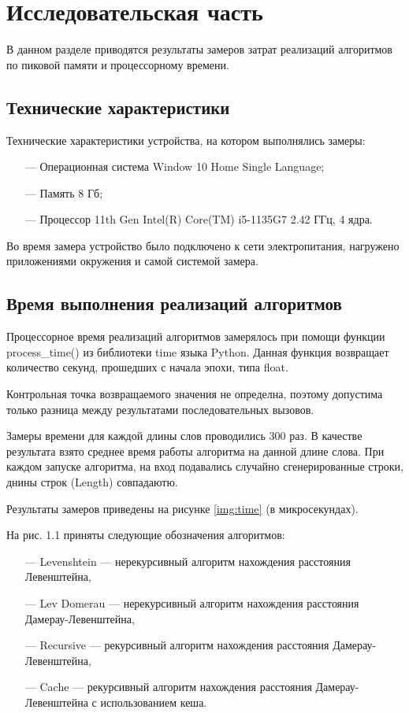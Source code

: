 \chapter{Исследовательская часть}

В данном разделе приводятся результаты замеров затрат реализаций алгоритмов по пиковой памяти и процессорному времени.

\section{Технические характеристики}

Технические характеристики устройства, на котором выполнялись замеры:

\begin{itemize}
	\item[---] Операционная система Window 10 Home Single Language;
	\item[---] Память 8 Гб;
	\item[---] Процессор 11th Gen Intel(R) Core(TM) i5-1135G7 2.42 ГГц, 4 ядра.
\end{itemize}

Во время замера устройство было подключено к сети электропитания, нагружено приложениями окружения и самой системой замера.

\section{Время выполнения реализаций алгоритмов}

Процессорное время реализаций алгоритмов замерялось при помощи функции process\_time() из библиотеки time языка Python. Данная функция возвращает количество секунд, прошедших с начала эпохи, типа float.

Контрольная точка возвращаемого значения не определна, поэтому допустима только разница между результатами последовательных вызовов.

Замеры времени для каждой длины слов проводились 300 раз. В качестве результата взято среднее время работы алгоритма на данной длине слова. При каждом запуске алгоритма, на вход подавались случайно сгенерированные строки, днины строк (Length) совпадаютю.

Результаты замеров приведены на рисунке \ref{img:time} (в микросекундах).

\newpage
На рис. 1.1 приняты следующие обозначения алгоритмов:
\begin{itemize}
    \item[---] Levenshtein --- нерекурсивный алгоритм нахождения расстояния \\Левенштейна,
    \item[---] Lev Domerau --- нерекурсивный алгоритм нахождения расстояния \\Дамерау-Левенштейна,
    \item[---] Recursive --- рекурсивный алгоритм нахождения расстояния Дамерау-Левенштейна,
    \item[---] Cache --- рекурсивный алгоритм нахождения расстояния Дамерау-Левенштейна с использованием кеша.
\end{itemize}

